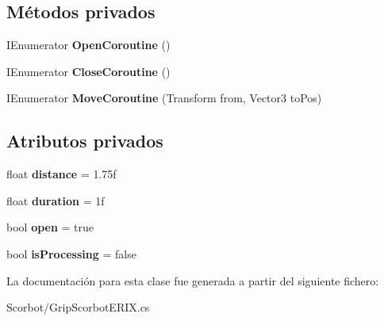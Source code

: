 \subsection*{Métodos privados}
\begin{DoxyCompactItemize}
\item 
\mbox{\label{class_grip_scorbot_e_r_i_x_adbd6c8857d2023f488535dcb729a75d2}} 
I\+Enumerator {\bfseries Open\+Coroutine} ()
\item 
\mbox{\label{class_grip_scorbot_e_r_i_x_a57a849f607ab9a3d606f8b2003f11ce1}} 
I\+Enumerator {\bfseries Close\+Coroutine} ()
\item 
\mbox{\label{class_grip_scorbot_e_r_i_x_a96ea032a05d7c6e6099ed42619693557}} 
I\+Enumerator {\bfseries Move\+Coroutine} (Transform from, Vector3 to\+Pos)
\end{DoxyCompactItemize}
\subsection*{Atributos privados}
\begin{DoxyCompactItemize}
\item 
\mbox{\label{class_grip_scorbot_e_r_i_x_a791d26fd5c3a944f540e2adf7cfda247}} 
float {\bfseries distance} = 1.\+75f
\item 
\mbox{\label{class_grip_scorbot_e_r_i_x_afb1d27e63afbb94165f442ffab6ed518}} 
float {\bfseries duration} = 1f
\item 
\mbox{\label{class_grip_scorbot_e_r_i_x_aa22acdc647fbaf00c6ae208b79d8a856}} 
bool {\bfseries open} = true
\item 
\mbox{\label{class_grip_scorbot_e_r_i_x_a560c01d104571a7a9246ffba7f09e4ed}} 
bool {\bfseries is\+Processing} = false
\end{DoxyCompactItemize}


La documentación para esta clase fue generada a partir del siguiente fichero\+:\begin{DoxyCompactItemize}
\item 
Scorbot/Grip\+Scorbot\+E\+R\+I\+X.\+cs\end{DoxyCompactItemize}
